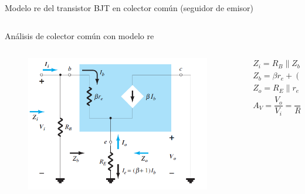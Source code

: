 \documentclass[t,aspectratio=169]{beamer}
\begin{document}
\begin{frame}{Modelo re del transistor BJT en colector común (seguidor de emisor)}
\begin{columns}
\begin{column}{0.5\textwidth}
\end{column}
\end{columns}

\end{frame}


\begin{frame}{Análisis de colector común con modelo re}

\begin{columns}
\begin{column}{0.5\textwidth}

\begin{figure}[H]
    \centering
    \includegraphics[width=\textwidth]{figuras/modelo_re_colector_comun_2.png}
\end{figure}

\end{column}
\begin{column}{0.5\textwidth}

\begin{align*}
&\boxed{Z_i = R_B \parallel Z_b} \\
&\boxed{Z_b = \beta r_e + (\beta + 1) R_E} \\
&\boxed{Z_o = R_E \parallel r_e} \\
&\boxed{A_V = \dfrac{V_o}{V_i} = \dfrac{R_E}{R_E + r_e}} \\
\end{align*}

\end{column}
\end{columns}

\end{frame}
\end{document}
